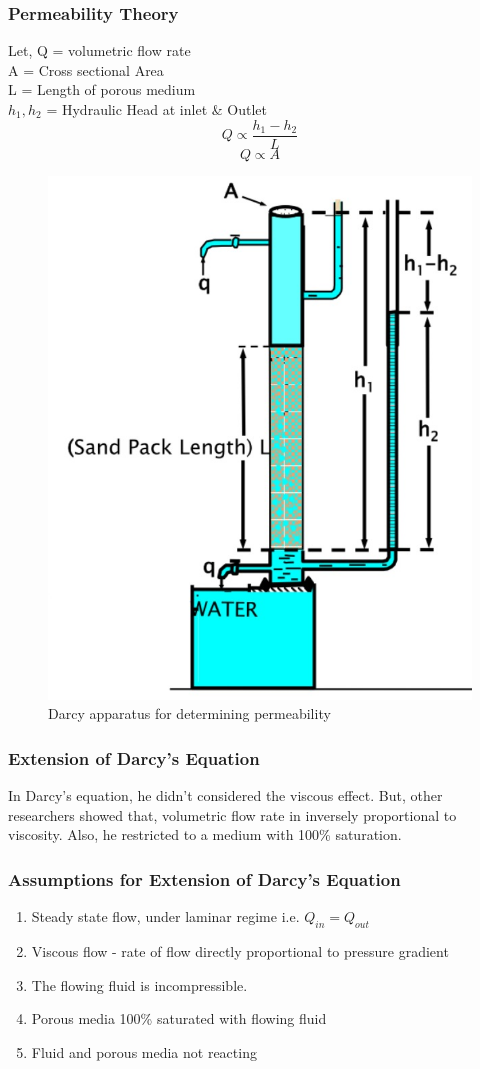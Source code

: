 \documentclass{article}
\begin{document}
    \subsubsection*{Permeability Theory}
    Let, Q = volumetric flow rate \\
    A = Cross sectional Area \\ 
    L = Length of porous medium \\ 
    $h_1, h_2$ = Hydraulic Head at inlet \& Outlet \\ 
    $$Q \propto \frac{h_1 - h_2}{L} $$
    $$Q \propto A $$
    \begin{figure}[h]
        \begin{center}
            \includegraphics[width=0.5\linewidth]{img/darcy_apparatus.jpeg}
            \caption{Darcy apparatus for determining permeability}
        \end{center}
    \end{figure}

    \subsubsection*{Extension of Darcy's Equation}
    In Darcy's equation, he didn't considered the viscous effect. But, other researchers showed that, volumetric flow rate in inversely proportional to viscosity. Also, he restricted to a medium with 100\% saturation. 

    \subsubsection*{Assumptions for Extension of Darcy's Equation}
    \begin{enumerate}
        \item Steady state flow, under laminar
        regime i.e. $Q_{in} = Q_{out}$
        \item Viscous flow - rate of flow directly proportional to pressure gradient
        \item The flowing fluid is incompressible.
        \item Porous media 100\% saturated with flowing fluid
        \item Fluid and porous media not reacting       
    \end{enumerate}
\end{document}
